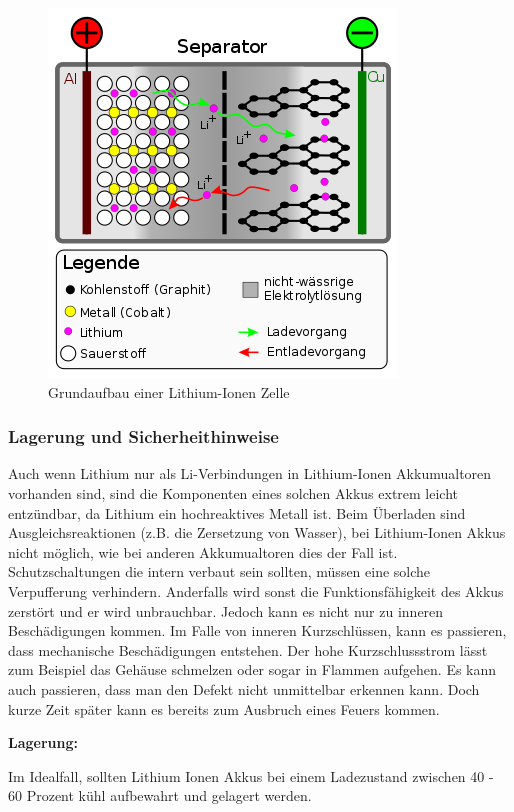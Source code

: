 \begin{figure}[H]
	\begin{center}
		\includegraphics[scale=0.5]{figures/Akku/350px-Li-Ion-Zelle_(CoO2-Carbon,_Schema).svg.png}
		\caption{Grundaufbau einer Lithium-Ionen Zelle}
	\end{center}
\end{figure}
\newpage

\subsubsection{Lagerung und Sicherheithinweise}
Auch wenn Lithium nur als Li-Verbindungen in Lithium-Ionen Akkumualtoren vorhanden sind, sind die Komponenten eines solchen Akkus extrem leicht entzündbar, da Lithium ein hochreaktives Metall ist. Beim Überladen sind Ausgleichsreaktionen (z.B. die Zersetzung von Wasser), bei Lithium-Ionen Akkus nicht möglich, wie bei anderen Akkumualtoren dies der Fall ist. Schutzschaltungen die intern verbaut sein sollten, müssen eine solche Verpufferung verhindern. Anderfalls wird sonst die Funktionsfähigkeit des Akkus zerstört und er wird unbrauchbar. 
Jedoch kann es nicht nur zu inneren Beschädigungen kommen. Im Falle von inneren Kurzschlüssen, kann es passieren, dass mechanische Beschädigungen entstehen. Der hohe Kurzschlussstrom lässt zum Beispiel das Gehäuse schmelzen oder sogar in Flammen aufgehen. Es kann auch passieren, dass man den Defekt nicht unmittelbar erkennen kann. Doch kurze Zeit später kann es bereits zum Ausbruch eines Feuers kommen.

\textbf{Lagerung:}

Im Idealfall, sollten Lithium Ionen Akkus bei einem Ladezustand zwischen 40 - 60 Prozent kühl aufbewahrt und gelagert werden.


